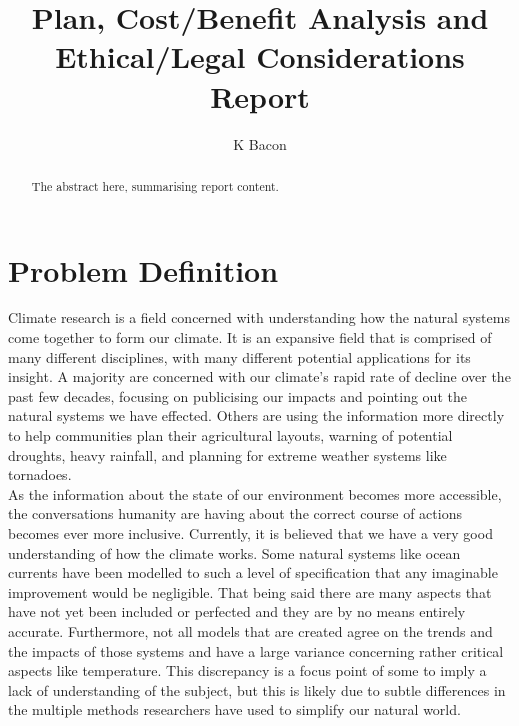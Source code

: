 \documentclass{ecmm427_assignment}
\begin{document}
\tableofcontents

\title{Plan, Cost/Benefit Analysis and Ethical/Legal Considerations Report}
\author{K Bacon}
\maketitle

\begin{abstract}
The abstract here, summarising report content. \blindtext
\end{abstract}

\declaration
\newpage %

\section{Problem Definition}

\quad Climate research is a field concerned with understanding how the natural systems come together to form our climate. It is an expansive field that is comprised of many different disciplines, with many different potential applications for its insight. A majority are concerned with our climate's rapid rate of decline over the past few decades, focusing on publicising our impacts and pointing out the natural systems we have effected. Others are using the information more directly to help communities plan their agricultural layouts, warning of potential droughts, heavy rainfall, and planning for extreme weather systems like tornadoes.\\
\quad As the information about the state of our environment becomes more accessible, the conversations humanity are having about the correct course of actions becomes ever more inclusive. Currently, it is believed that we have a very good understanding of how the climate works. Some natural systems like ocean currents have been modelled to such a level of specification that any imaginable improvement would be negligible. That being said there are many aspects that have not yet been included or perfected and they are by no means entirely accurate. Furthermore, not all models that are created agree on the trends and the impacts of those systems and have a large variance concerning rather critical aspects like temperature. This discrepancy is a focus point of some to imply a lack of understanding of the subject, but this is likely due to subtle differences in the multiple methods researchers have used to simplify our natural world. \\
\end{document}

